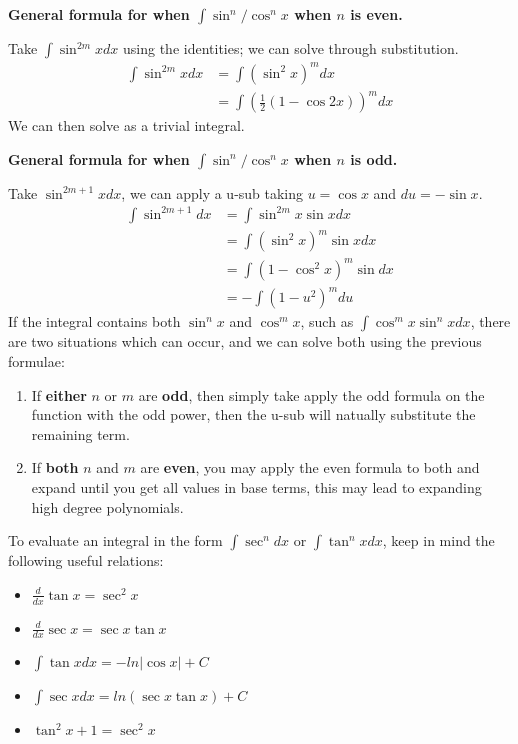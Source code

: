 \documentclass[a4paper]{article}
\begin{document}
  \textbf{General formula for when $\int \sin^n / \cos^n x$ when $n$ is even.}

  Take $\int \sin^{2m} x dx$ using the identities; we can solve through substitution.
  \begin{equation}
   \begin{split}
     \int \sin^{2m} x dx&= \int (\sin^2 x)^m dx \\
                      &= \int (\frac{1 }{2}(1-\cos2x))^m dx
   \end{split} 
  \end{equation}
  We can then solve as a trivial integral.

  \textbf{General formula for when $\int \sin^n / \cos^n x$ when $n$ is odd.}

  Take $\sin^{2m+1} xdx$, we can apply a u-sub taking $u = \cos x$ and $du = -\sin x$.
  \begin{equation}
   \begin{split}
     \int \sin^{2m+1}dx &= \int \sin^{2m} x \sin x dx \\
                        &= \int (\sin^2 x)^m \sin x dx \\
                        &= \int (1 - \cos^2 x)^m \sin dx \\
                        &= -\int (1-u^2)^m du
   \end{split} 
  \end{equation}
  If the integral contains both $\sin^n x$ and $\cos^m x$, such as $\int \cos^m x \sin^n x dx$, there are two situations which can occur, and we can solve both using the previous formulae:
  \begin{enumerate}
    \item If \textbf{either} $n$ or $m$ are \textbf{odd}, then simply take apply the odd formula on the function with the odd power, then the u-sub will natually substitute the remaining term.
    \item If \textbf{both} $n$ and $m$ are \textbf{even}, you may apply the even formula to both and expand until you get all values in base terms, this may lead to expanding high degree polynomials.
  \end{enumerate}
  To evaluate an integral in the form $\int \sec^ndx$ or $\int \tan^n x dx$, keep in mind the following useful relations:
  \begin{itemize}
    \item $\frac{d }{dx} \tan x = \sec^2 x$
    \item $\frac{d }{dx} \sec x = \sec x \tan x$
    \item $\int \tan x dx = -ln|\cos x| + C$
    \item $\int \sec x dx = ln(\sec x \tan x) + C$
    \item $\tan^2 x + 1 = \sec^2 x$
  \end{itemize}
\end{document}
